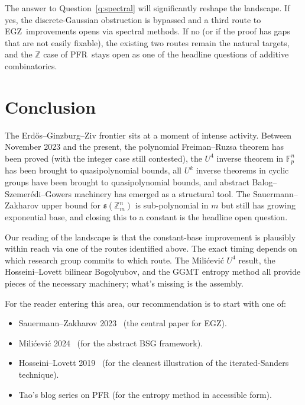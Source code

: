 \documentclass[11pt,a4paper]{article}
\theoremstyle{plain}
\theoremstyle{definition}
\theoremstyle{remark}
\newcommand{\F}{\mathbb{F}}
\newcommand{\Z}{\mathbb{Z}}
\newcommand{\sUFp}{\mathfrak{s}}
\newcommand{\PFR}{\textsf{PFR}}
\newcommand{\EGZ}{\textsf{EGZ}}
\begin{document}
The answer to Question~\ref{q:spectral} will significantly reshape the landscape. If yes, the discrete-Gaussian obstruction is bypassed and a third route to \EGZ\ improvements opens via spectral methods. If no (or if the proof has gaps that are not easily fixable), the existing two routes remain the natural targets, and the $\Z$ case of \PFR\ stays open as one of the headline questions of additive combinatorics.

\section{Conclusion}

The Erd\H{o}s--Ginzburg--Ziv frontier sits at a moment of intense activity. Between November 2023 and the present, the polynomial Freiman--Ruzsa theorem has been proved (with the integer case still contested), the $U^4$ inverse theorem in $\F_p^n$ has been brought to quasipolynomial bounds, all $U^k$ inverse theorems in cyclic groups have been brought to quasipolynomial bounds, and abstract Balog--Szemer\'edi--Gowers machinery has emerged as a structural tool. The Sauermann--Zakharov upper bound for $\sUFp(\Z_m^n)$ is sub-polynomial in $m$ but still has growing exponential base, and closing this to a constant is the headline open question.

Our reading of the landscape is that the constant-base improvement is plausibly within reach via one of the routes identified above. The exact timing depends on which research group commits to which route. The Milićević $U^4$ result, the Hosseini--Lovett bilinear Bogolyubov, and the GGMT entropy method all provide pieces of the necessary machinery; what's missing is the assembly.

For the reader entering this area, our recommendation is to start with one of:

\begin{itemize}[leftmargin=2em]
  \item Sauermann--Zakharov 2023~\cite{sauermannzakharov2023} (the central paper for \EGZ).
  \item Milićević 2024~\cite{milicevic2024} (for the abstract BSG framework).
  \item Hosseini--Lovett 2019~\cite{hosseinilovett2019} (for the cleanest illustration of the iterated-Sanders technique).
  \item Tao's blog series on PFR (for the entropy method in accessible form).
\end{itemize}
\end{document}
